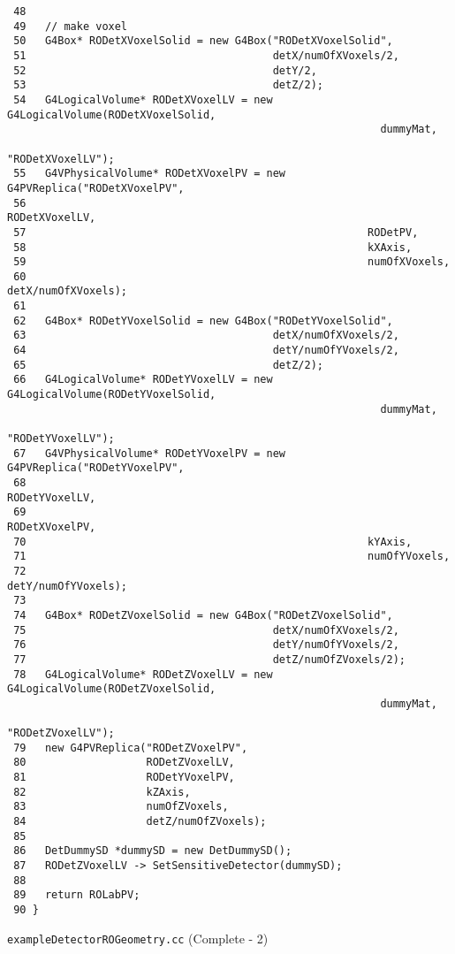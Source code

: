 \begin{code}[p]
\begin{lstlisting}
 48
 49   // make voxel
 50   G4Box* RODetXVoxelSolid = new G4Box("RODetXVoxelSolid",
 51                                       detX/numOfXVoxels/2,
 52                                       detY/2,
 53                                       detZ/2);
 54   G4LogicalVolume* RODetXVoxelLV = new G4LogicalVolume(RODetXVoxelSolid,
                                                           dummyMat,
                                                           "RODetXVoxelLV");
 55   G4VPhysicalVolume* RODetXVoxelPV = new G4PVReplica("RODetXVoxelPV",
 56                                                      RODetXVoxelLV,
 57                                                      RODetPV,
 58                                                      kXAxis,
 59                                                      numOfXVoxels,
 60                                                      detX/numOfXVoxels);
 61 
 62   G4Box* RODetYVoxelSolid = new G4Box("RODetYVoxelSolid",
 63                                       detX/numOfXVoxels/2,
 64                                       detY/numOfYVoxels/2,
 65                                       detZ/2);
 66   G4LogicalVolume* RODetYVoxelLV = new G4LogicalVolume(RODetYVoxelSolid,
                                                           dummyMat,
                                                           "RODetYVoxelLV");
 67   G4VPhysicalVolume* RODetYVoxelPV = new G4PVReplica("RODetYVoxelPV",
 68                                                      RODetYVoxelLV,
 69                                                      RODetXVoxelPV,
 70                                                      kYAxis,
 71                                                      numOfYVoxels,
 72                                                      detY/numOfYVoxels);
 73 
 74   G4Box* RODetZVoxelSolid = new G4Box("RODetZVoxelSolid",
 75                                       detX/numOfXVoxels/2,
 76                                       detY/numOfYVoxels/2,
 77                                       detZ/numOfZVoxels/2);
 78   G4LogicalVolume* RODetZVoxelLV = new G4LogicalVolume(RODetZVoxelSolid,
                                                           dummyMat,
                                                           "RODetZVoxelLV");
 79   new G4PVReplica("RODetZVoxelPV",
 80                   RODetZVoxelLV,
 81                   RODetYVoxelPV,
 82                   kZAxis,
 83                   numOfZVoxels,
 84                   detZ/numOfZVoxels);
 85 
 86   DetDummySD *dummySD = new DetDummySD();
 87   RODetZVoxelLV -> SetSensitiveDetector(dummySD);
 88 
 89   return ROLabPV;
 90 }
\end{lstlisting}
\caption{\texttt{exampleDetectorROGeometry.cc} (Complete - 2) \label{code-4-5}}
\end{code}

